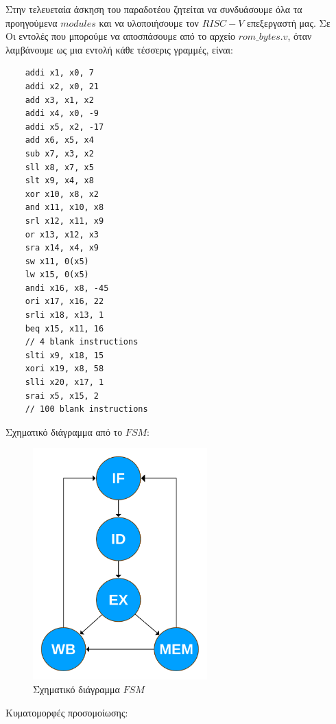 Στην τελευεταία άσκηση του παραδοτέου ζητείται να συνδυάσουμε όλα τα προηγούμενα $modules$
και να υλοποιήσουμε τον $RISC-V$ επεξεργαστή μας. Σε 
\\
Οι εντολές που μπορούμε να αποσπάσουμε από το αρχείο $rom\_bytes.v$, όταν λαμβάνουμε ως
μια εντολή κάθε τέσσερις γραμμές, είναι:
\begin{verbatim}
    addi x1, x0, 7
    addi x2, x0, 21
    add x3, x1, x2
    addi x4, x0, -9
    addi x5, x2, -17
    add x6, x5, x4
    sub x7, x3, x2
    sll x8, x7, x5
    slt x9, x4, x8
    xor x10, x8, x2
    and x11, x10, x8
    srl x12, x11, x9
    or x13, x12, x3
    sra x14, x4, x9
    sw x11, 0(x5)
    lw x15, 0(x5)
    andi x16, x8, -45
    ori x17, x16, 22
    srli x18, x13, 1
    beq x15, x11, 16
    // 4 blank instructions
    slti x9, x18, 15
    xori x19, x8, 58
    slli x20, x17, 1
    srai x5, x15, 2
    // 100 blank instructions
\end{verbatim}
Σχηματικό διάγραμμα από το $FSM$:
\begin{figure}[H]
    \centering
    \includegraphics[width=0.6\textwidth]{media/exercise5_fsm.png}
    \caption{Σχηματικό διάγραμμα $FSM$}
\end{figure}
Κυματομορφές προσομοίωσης:
